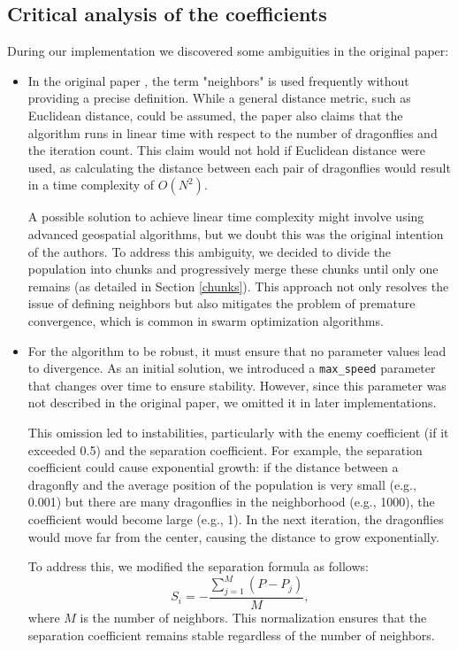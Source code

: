 \documentclass[10pt]{article}
\begin{document}
\begin{multicols}{2}
\section{Critical analysis of the coefficients}
During our implementation we discovered some ambiguities in the original paper:
\begin{itemize}
  \item In the original paper \cite{Original}, the term "neighbors" is used frequently without providing a precise definition.
  While a general distance metric, such as Euclidean distance, could be assumed, the paper also claims that the algorithm runs in linear time with respect to the number of dragonflies and the iteration count.
  This claim would not hold if Euclidean distance were used, as calculating the distance between each pair of dragonflies would result in a time complexity of $O(N^2)$. 

  A possible solution to achieve linear time complexity might involve using advanced geospatial algorithms, but we doubt this was the original intention of the authors.
  To address this ambiguity, we decided to divide the population into chunks and progressively merge these chunks until only one remains (as detailed in Section \ref{chunks}).
  This approach not only resolves the issue of defining neighbors but also mitigates the problem of premature convergence, which is common in swarm optimization algorithms.

  \item For the algorithm to be robust, it must ensure that no parameter values lead to divergence.
  As an initial solution, we introduced a \texttt{max\_speed} parameter that changes over time to ensure stability.
  However, since this parameter was not described in the original paper, we omitted it in later implementations. 

  This omission led to instabilities, particularly with the enemy coefficient (if it exceeded 0.5) and the separation coefficient.
  For example, the separation coefficient could cause exponential growth: if the distance between a dragonfly and the average position of the population is very small (e.g., 0.001) but there are many dragonflies in the neighborhood (e.g., 1000), the coefficient would become large (e.g., 1).
  In the next iteration, the dragonflies would move far from the center, causing the distance to grow exponentially.

  To address this, we modified the separation formula as follows:
  $$S_i = - \frac{\sum_{j=1}^M (P - P_j)}{M},$$
  where $M$ is the number of neighbors.
  This normalization ensures that the separation coefficient remains stable regardless of the number of neighbors.


\end{itemize}
\end{multicols}
\end{document}
